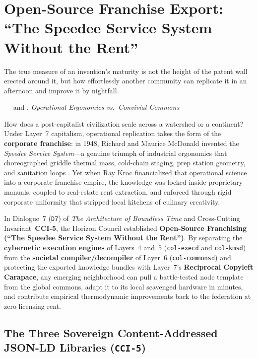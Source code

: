 \chapter{Open-Source Franchise Export: ``The Speedee Service System Without the Rent''}
\label{ch:l7-open-source-franchising}

\epigraph{The true measure of an invention's maturity is not the height of the patent wall erected around it, but how effortlessly another community can replicate it in an afternoon and improve it by nightfall.}{---\textcite{love1986mcdonalds} and \textcite{illich1973}, \textit{Operational Ergonomics vs.\ Convivial Commons}}

How does a post-capitalist civilization scale across a watershed or a continent? Under Layer~7 capitalism, operational replication takes the form of the \textbf{corporate franchise}: in 1948, Richard and Maurice McDonald invented the \textit{Speedee Service System}---a genuine triumph of industrial ergonomics that choreographed griddle thermal mass, cold-chain staging, prep station geometry, and sanitation loops \parencite{love1986mcdonalds}. Yet when Ray Kroc financialized that operational science into a corporate franchise empire, the knowledge was locked inside proprietary manuals, coupled to real-estate rent extraction, and enforced through rigid corporate uniformity that stripped local kitchens of culinary creativity.

In Dialogue~7 (\texttt{D7}) of \textit{The Architecture of Boundless Time} and Cross-Cutting Invariant~\textbf{CCI-5}, the Horizon Council established \textbf{Open-Source Franchising (``The Speedee Service System Without the Rent'')}. By separating the \textbf{cybernetic execution engines} of Layers~4 and~5 (\texttt{col-execd} and \texttt{col-kmsd}) from the \textbf{societal compiler/decompiler} of Layer~6 (\texttt{col-commonsd}) and protecting the exported knowledge bundles with Layer~7's \textbf{Reciprocal Copyleft Carapace}, any emerging neighborhood can pull a battle-tested node template from the global commons, adapt it to its local scavenged hardware in minutes, and contribute empirical thermodynamic improvements back to the federation at zero licensing rent.

\section{The Three Sovereign Content-Addressed JSON-LD Libraries (\texttt{CCI-5})}
\label{sec:l7-three-sovereign-libraries}

